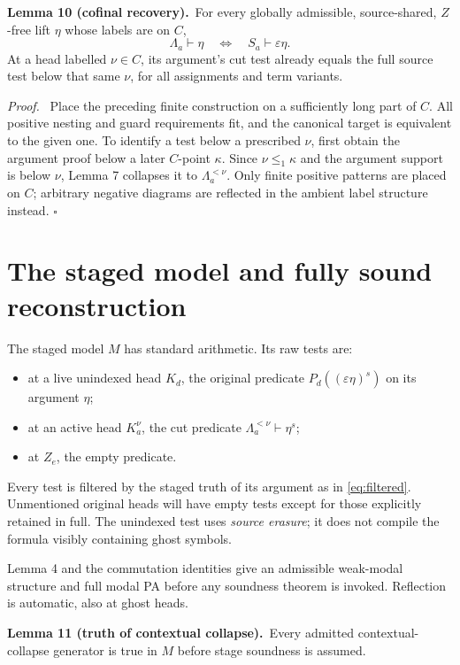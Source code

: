 \documentclass[11pt]{article}
\newcommand{\cut}[2]{\Lambda_{#1}^{< #2}}
\newcommand{\eps}{\varepsilon}
\newcommand{\qed}{\hfill\ensuremath{\square}}
\newenvironment{proof}{\par\emph{Proof.}\ }{\qed\par}
\newcommand{\statement}[2]{\par\textbf{#1.}\ #2\par}
\begin{document}
\statement{Lemma 10 (cofinal recovery)}{For every globally admissible,
source-shared, $Z$-free lift $\eta$ whose labels are on $C$,
\begin{equation}\label{eq:cofinal}
 \Lambda_a\vdash\eta\quad\Longleftrightarrow\quad
 S_a\vdash\eps\eta.
\end{equation}
At a head labelled $\nu\in C$, its argument's cut test already equals
the full source test below that same $\nu$, for all assignments and
term variants.}

\begin{proof}
Place the preceding finite construction on a sufficiently long part
of $C$. All positive nesting and guard requirements fit, and the
canonical target is equivalent to the given one. To identify a test
below a prescribed $\nu$, first obtain the argument proof below a
later $C$-point $\kappa$. Since $\nu\le_1\kappa$ and the argument
support is below $\nu$, Lemma 7 collapses it to $\cut a\nu$.
Only finite positive patterns are placed on $C$; arbitrary negative
diagrams are reflected in the ambient label structure instead.
\end{proof}

\section{The staged model and fully sound reconstruction}\label{sec:masks}

The staged model $M$ has standard arithmetic. Its raw tests are:
\begin{itemize}
\item at a live unindexed head $K_d$, the original predicate
$P_d((\eps\eta)^s)$ on its argument $\eta$;
\item at an active head $K_a^\nu$, the cut predicate
$\cut a\nu\vdash\eta^s$;
\item at $Z_e$, the empty predicate.
\end{itemize}
Every test is filtered by the staged truth of its argument as in
\eqref{eq:filtered}. Unmentioned original heads will have empty tests
except for those explicitly retained in full. The unindexed test uses
\emph{source erasure}; it does not compile the formula visibly
containing ghost symbols.

Lemma 4 and the commutation identities give an admissible weak-modal
structure and full modal PA before any soundness theorem is invoked.
Reflection is automatic, also at ghost heads.

\statement{Lemma 11 (truth of contextual collapse)}{Every admitted
contextual-collapse generator is true in $M$ before stage soundness
is assumed.}
\end{document}
